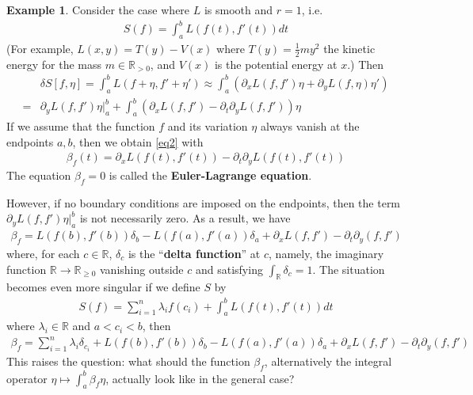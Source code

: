 \documentclass[12pt,b5paper,notitlepage]{article}
\theoremstyle{definition}
\newtheorem{eg}[df]{Example}
\theoremstyle{plain}
\newcommand{\Rbb}{\mathbb R}
\newcommand{\dps}{\displaystyle}
\numberwithin{equation}{section}
\begin{document}
\begin{eg}
Consider the case where $L$ is smooth and $r=1$, i.e.
\begin{align*}
S(f)=\int_a^b L(f(t),f'(t))dt
\end{align*}
(For example, $L(x,y)=T(y)-V(x)$ where $T(y)=\frac 12 my^2$ the kinetic energy for the mass $m\in\Rbb_{>0}$, and $V(x)$ is the potential energy at $x$.) Then
\begin{align*}
&\delta S[f,\eta]=\int_a^b L(f+\eta,f'+\eta')\approx \int_a^b (\partial_x L(f,f')\eta+\partial_y L(f,\eta)\eta')\\
=&\partial_yL(f,f')\eta\big|_a^b+\int_a^b (\partial_xL(f,f')-\partial_t\partial_yL(f,f'))\eta
\end{align*}
If we assume that the function $f$ and its variation $\eta$ always vanish at the endpoints $a,b$, then we obtain \eqref{eq2} with
\begin{align*}
\beta_f(t)=\partial_xL(f(t),f'(t))-\partial_t\partial_yL(f(t),f'(t))
\end{align*}
The equation $\beta_f=0$ is called the \textbf{Euler-Lagrange equation}. 

However, if no boundary conditions are imposed on the endpoints, then the term $\partial_yL(f,f')\eta\big|_a^b$ is not necessarily zero. As a result, we have
\begin{align*}
\beta_f=L(f(b),f'(b))\delta_b-L(f(a),f'(a))\delta_a+\partial_xL(f,f')-\partial_t\partial_y(f,f')
\end{align*}
where, for each $c\in\Rbb$, $\delta_c$ is the ``\textbf{delta function}''  at $c$, namely, the imaginary function $\Rbb\rightarrow\Rbb_{\geq0}$ vanishing outside $c$ and satisfying $\int_\Rbb\delta_c=1$. The situation becomes even more singular if we define $S$ by
\begin{align*}
S(f)=\sum_{i=1}^n \lambda_i f(c_i)+\int_a^b L(f(t),f'(t))dt
\end{align*} 
where $\lambda_i\in\Rbb$ and $a<c_i<b$, then
\begin{align*}
\beta_f=\sum_{i=1}^n \lambda_i\delta_{c_i}+L(f(b),f'(b))\delta_b-L(f(a),f'(a))\delta_a+\partial_xL(f,f')-\partial_t\partial_y(f,f')
\end{align*}
This raises the question: what should the function $\beta_f$, alternatively the integral operator $\dps\eta\mapsto \int_a^b\beta_f\eta$, actually look like in the general case?  \hfill\qedsymbol
\end{eg}
\end{document}
